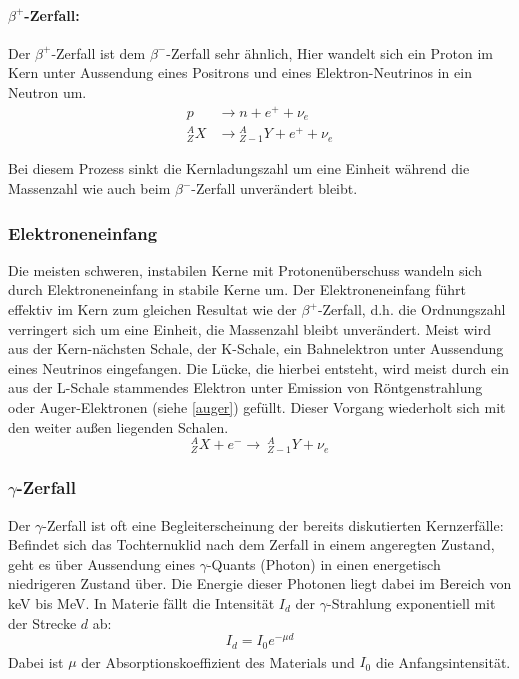 \documentclass[12pt,listof=totoc]{scrartcl}
\begin{document}
\paragraph*{$\beta^+$-Zerfall:}
Der $\beta^+$-Zerfall ist dem $\beta^-$-Zerfall sehr ähnlich, Hier wandelt sich ein Proton im Kern unter Aussendung eines Positrons und eines Elektron-Neutrinos in ein Neutron um.
\begin{align*}
p &\rightarrow n + e^+ + \nu_e\\
{}_Z^A X &\rightarrow {}_{Z-1}^A Y + e^+ + \nu_e
\end{align*}

Bei diesem Prozess sinkt die Kernladungszahl um eine Einheit während die Massenzahl wie auch beim $\beta^-$-Zerfall unverändert bleibt.

\subsubsection{Elektroneneinfang}
Die meisten schweren, instabilen Kerne mit Protonenüberschuss wandeln sich durch Elektroneneinfang in stabile Kerne um.
Der Elektroneneinfang führt effektiv im Kern zum gleichen Resultat wie der $\beta^+$-Zerfall, d.h. die Ordnungszahl verringert sich um eine Einheit, die Massenzahl bleibt unverändert. Meist wird aus der Kern-nächsten Schale, der K-Schale, ein Bahnelektron unter Aussendung eines Neutrinos eingefangen. Die Lücke, die hierbei entsteht, wird meist durch ein aus der L-Schale stammendes Elektron unter Emission von Röntgenstrahlung oder Auger-Elektronen (siehe \ref{auger}) gefüllt. Dieser Vorgang wiederholt sich mit den weiter außen liegenden Schalen.
\[{}_Z^A X + e^- \rightarrow\ {}_{Z-1}^A Y + \nu_e\]
\subsubsection{$\gamma$-Zerfall \label{gamma}}

Der $\gamma$-Zerfall ist oft eine Begleiterscheinung der bereits diskutierten Kernzerfälle: Befindet sich das Tochternuklid nach dem Zerfall in einem angeregten Zustand, geht es über Aussendung eines $\gamma$-Quants (Photon) in einen energetisch niedrigeren Zustand über. Die Energie dieser Photonen liegt dabei im Bereich von keV bis MeV. In Materie fällt die Intensität $I_d$ der $\gamma$-Strahlung exponentiell mit der Strecke $d$ ab:
\[I_d=I_0e^{-\mu d}\]
Dabei ist $\mu$ der Absorptionskoeffizient des Materials und $I_0$ die Anfangsintensität.\textsuperscript{\cite{Demtröder}}
\end{document}
